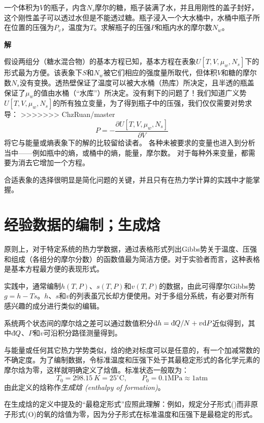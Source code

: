 \begin{example}
一个体积为$V$的瓶子，内含$N_s$摩尔的糖，瓶子装满了水，并且用刚性的盖子封好，这个刚性盖子可以透过水但是不能透过糖。瓶子浸入一个大水桶中，水桶中瓶子所在位置的压强为$P_v$，温度为$T$。求解瓶子的压强$P$和瓶内水的摩尔数$N_w$。

{\bf 解}

假设两组分（糖水混合物）的基本方程已知，基本方程在表象$U[T, V, \mu_w, N_s]$下的形式最为方便。该表象下$S$和$N_{w}$被它们相应的强度量所取代，但体积$V$和糖的摩尔数$N_{s}$没有变换。透热壁保证了温度可以被大水桶（热库）所决定，且半透的瓶盖保证了$\mu_{w}$的值由水桶（“水库”）所决定。没有剩下的问题了！我们知道广义势$U[T, V, \mu_{w}, N_{s}]$的所有独立变量，为了得到瓶子中的压强，我们仅仅需要对势求导：
>>>>>>> ChzRuan/master
\[ P=-\frac{\partial U[T, V, \mu_{w}, N_{s}]}{\partial V} \]
将它与能量或熵表象下的解的比较留给读者。
各种未被要求的变量也进入到分析当中——例如瓶中的熵，或桶中的熵，能量，摩尔数。
对于每种外来变量，都需要为消去它增加一个方程。

合适表象的选择很明显是简化问题的关键，并且只有在热力学计算的实践中才能掌握。
\end{example}

\section{经验数据的编制；生成焓}
\label{sec6.6}
原则上，对于特定系统的热力学数据，通过表格形式列出Gibbs势关于温度、压强和组成（各组分的摩尔分数）的函数值最为简洁方便。对于实验者而言，这种表格是基本方程最方便的表现形式。

实践中，通常编制$h(T,P)$、$s(T,P)$和$v(T,P)$的数据，由此可得摩尔Gibbs势$g = h - Ts$。$h$、$s$和$v$的列表虽冗长却方便使用。对于多组分系统，有必要对所有感兴趣的成分进行类似的编辑。

系统两个状态间的摩尔焓之差可以通过数值积分$\mathrm{d} h=\mathrm d\hspace*{-0.1em}\bar{}\hspace*{0.08em} Q/N + v \mathrm{d}  P$近似得到，其中$\mathrm d\hspace*{-0.1em}\bar{}\hspace*{0.08em} Q$、$P$和$v$可沿积分路径测量得到。


与能量或任何其它热力学势类似，焓的绝对标度可以是任意的，有一个加减常数的不确定度。为了编制数据，令标准温度和压强下处于其最稳定形式的各化学元素的摩尔焓为零，这样就明确定义了焓值。标准状态一般取为：
\[ T_0 = \SI{298.15}{K} = 25^{\circ}\mathrm{C}, \qquad P_0 = 0.1 \text{MPa} \approx 1 \text{atm} \]
由此定义的焓称作{\it 生成焓 (enthalpy of formation)}。

在生成焓的定义中提及的“最稳定形式”应照此理解：例如，规定分子形式()而非原子形式(O)的氧的焓值为零，因为分子形式在标准温度和压强下是最稳定的形式。

